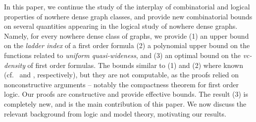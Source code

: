 In this paper, we continue the study of the 
interplay of combinatorial and logical properties
of nowhere dense graph classes, and provide
new combinatorial bounds on several
quantities appearing in the logical study of nowhere dense graphs.
Namely, for every nowhere dense class of graphs, we provide (1) an upper bound on the \emph{ladder index} of a first order formula
(2) a polynomial upper bound on the 
functions related to \emph{uniform quasi-wideness},
and (3) an optimal bound on the \emph{vc-density} of first order formulas. The bounds similar to (1) and (2)
where known (cf.~\cite{adler2014interpreting} and \cite{siebertz2016polynomial}, respectively), but they are not computable,
as the proofs relied on nonconstructive arguments -- notably the compactness theorem for first order logic. 
Our proofs are constructive and provide effective bounds.
The result (3) is completely new, and is the main contribution of this paper. We now discuss the relevant background from logic and model theory, motivating our results. 



\bigskip












